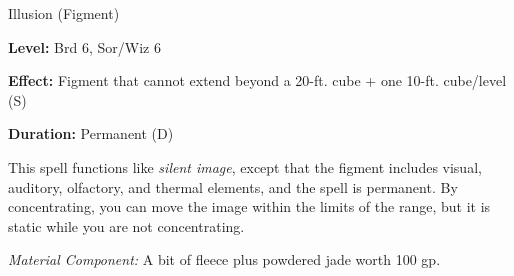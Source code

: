
Illusion (Figment)

\textbf{Level:} Brd 6, Sor/Wiz 6

\textbf{Effect:} Figment that cannot extend beyond a 20-ft. cube + one 10-ft. cube/level 
(S)

\textbf{Duration:} Permanent (D)

This spell functions like \textit{silent image}, except that the figment includes 
visual, auditory, olfactory, and thermal elements, and the spell is permanent. 
By concentrating, you can move the image within the limits of the range, but it 
is static while you are not concentrating.

\textit{Material Component:} A bit of fleece plus powdered jade worth 100 gp.

